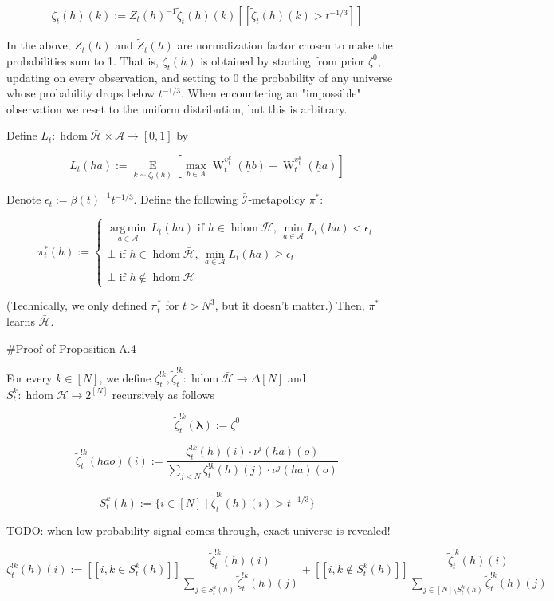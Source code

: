 \documentclass[a4paper]{article}
\newcommand{\E}[1]{\underset{#1}{\operatorname{E}}}
\newcommand{\Argmin}[1]{\underset{#1}{\operatorname{arg\,min}}\,}
\newcommand{\Estr}{\boldsymbol{\lambda}}
\newcommand{\A}{\mathcal{A}}
\newcommand{\I}{\mathcal{I}}
\newcommand{\Adi}{\bar{\I}}
\DeclareMathOperator{\HD}{hdom}
\newcommand{\Hy}{\mathcal{H}}
\newcommand{\W}{\operatorname{W}}
\begin{document}
$$\zeta_t(h)(k):=Z_t(h)^{-1}\tilde{\zeta}_t(h)(k)[[\tilde{\zeta}_t(h)(k) > t^{-1/3}]]$$

In the above, $Z_t(h)$ and $\tilde{Z}_t(h)$ are normalization factor chosen to make the probabilities sum to 1. That is, $\zeta_t(h)$ is obtained by starting from prior $\zeta^0$, updating on every observation, and setting to 0 the probability of any universe whose probability drops below $t^{-1/3}$. When encountering an "impossible" observation we reset to the uniform distribution, but this is arbitrary. 

Define $L_t: \HD{\bar{\Hy}} \times \A \rightarrow [0,1]$ by

$$L_t(ha):=\E{k \sim \zeta_t(h)}[\max_{b \in A}{\W^{\upsilon^k_t}_t(\underline{h}b)}-\W^{\upsilon^k_t}_t(\underline{h}a)]$$

Denote $\epsilon_t:=\beta(t)^{-1}t^{-1/3}$. Define the following $\Adi$-metapolicy $\pi^*$:

$$\pi^*_t(h):=\begin{cases} \Argmin{a \in \A} L_t(ha) \text{ if } h \in \HD{\bar{\Hy}},\, \min_{a \in \A}{L_t(ha)} < \epsilon_t \\ \bot \text{ if } h \in \HD{\bar{\Hy}},\,\min_{a \in \A}{L_t(ha)} \geq \epsilon_t \\ \bot \text{ if } h \not\in \HD{\bar{\Hy}}\end{cases}$$

(Technically, we only defined $\pi^*_t$ for $t > N^3$, but it doesn't matter.) Then, $\pi^*$ learns $\bar{\Hy}$.
 
\#Proof of Proposition A.4

For every $k \in [N]$, we define $\zeta^{!k}_t, \tilde{\zeta}^{!k}_t: \HD{\bar{\Hy}} \rightarrow \Delta[N]$ and $S_t^k: \HD{\bar{\Hy}} \rightarrow 2^{[N]}$ recursively as follows

$$\tilde{\zeta}^{!k}_t(\Estr):=\zeta^0$$

$$\tilde{\zeta}^{!k}_t(hao)(i):=\frac{\zeta^{!k}_t(h)(i) \cdot \nu^i(ha)(o)}{\sum_{j < N} \zeta^{!k}_t(h)(j) \cdot \nu^j(ha)(o)}$$

$$S_t^k(h):=\{i \in [N] \mid \tilde{\zeta}^{!k}_t(h)(i) > t^{-1/3}\}$$

TODO: when low probability signal comes through, exact universe is revealed!

$$\zeta^{!k}_t(h)(i):= [[i,k \in S_t^k(h)]]\frac{\tilde{\zeta}^{!k}_t(h)(i)}{\sum_{j \in S_t^k(h)}\tilde{\zeta}^{!k}_t(h)(j)}+[[i,k \not\in S_t^k(h)]]\frac{\tilde{\zeta}^{!k}_t(h)(i)}{\sum_{j \in [N] \setminus S_t^k(h)}\tilde{\zeta}^{!k}_t(h)(j)}$$
\end{document}
